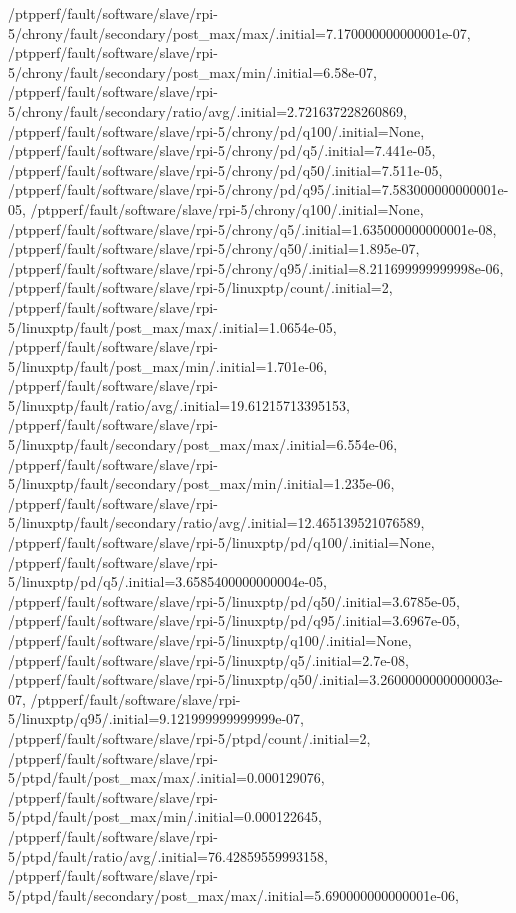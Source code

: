 {    /ptpperf/fault/software/slave/rpi-5/chrony/fault/secondary/post_max/max/.initial=7.170000000000001e-07,
    /ptpperf/fault/software/slave/rpi-5/chrony/fault/secondary/post_max/min/.initial=6.58e-07,
    /ptpperf/fault/software/slave/rpi-5/chrony/fault/secondary/ratio/avg/.initial=2.721637228260869,
    /ptpperf/fault/software/slave/rpi-5/chrony/pd/q100/.initial=None,
    /ptpperf/fault/software/slave/rpi-5/chrony/pd/q5/.initial=7.441e-05,
    /ptpperf/fault/software/slave/rpi-5/chrony/pd/q50/.initial=7.511e-05,
    /ptpperf/fault/software/slave/rpi-5/chrony/pd/q95/.initial=7.583000000000001e-05,
    /ptpperf/fault/software/slave/rpi-5/chrony/q100/.initial=None,
    /ptpperf/fault/software/slave/rpi-5/chrony/q5/.initial=1.635000000000001e-08,
    /ptpperf/fault/software/slave/rpi-5/chrony/q50/.initial=1.895e-07,
    /ptpperf/fault/software/slave/rpi-5/chrony/q95/.initial=8.211699999999998e-06,
    /ptpperf/fault/software/slave/rpi-5/linuxptp/count/.initial=2,
    /ptpperf/fault/software/slave/rpi-5/linuxptp/fault/post_max/max/.initial=1.0654e-05,
    /ptpperf/fault/software/slave/rpi-5/linuxptp/fault/post_max/min/.initial=1.701e-06,
    /ptpperf/fault/software/slave/rpi-5/linuxptp/fault/ratio/avg/.initial=19.61215713395153,
    /ptpperf/fault/software/slave/rpi-5/linuxptp/fault/secondary/post_max/max/.initial=6.554e-06,
    /ptpperf/fault/software/slave/rpi-5/linuxptp/fault/secondary/post_max/min/.initial=1.235e-06,
    /ptpperf/fault/software/slave/rpi-5/linuxptp/fault/secondary/ratio/avg/.initial=12.465139521076589,
    /ptpperf/fault/software/slave/rpi-5/linuxptp/pd/q100/.initial=None,
    /ptpperf/fault/software/slave/rpi-5/linuxptp/pd/q5/.initial=3.6585400000000004e-05,
    /ptpperf/fault/software/slave/rpi-5/linuxptp/pd/q50/.initial=3.6785e-05,
    /ptpperf/fault/software/slave/rpi-5/linuxptp/pd/q95/.initial=3.6967e-05,
    /ptpperf/fault/software/slave/rpi-5/linuxptp/q100/.initial=None,
    /ptpperf/fault/software/slave/rpi-5/linuxptp/q5/.initial=2.7e-08,
    /ptpperf/fault/software/slave/rpi-5/linuxptp/q50/.initial=3.2600000000000003e-07,
    /ptpperf/fault/software/slave/rpi-5/linuxptp/q95/.initial=9.121999999999999e-07,
    /ptpperf/fault/software/slave/rpi-5/ptpd/count/.initial=2,
    /ptpperf/fault/software/slave/rpi-5/ptpd/fault/post_max/max/.initial=0.000129076,
    /ptpperf/fault/software/slave/rpi-5/ptpd/fault/post_max/min/.initial=0.000122645,
    /ptpperf/fault/software/slave/rpi-5/ptpd/fault/ratio/avg/.initial=76.42859559993158,
    /ptpperf/fault/software/slave/rpi-5/ptpd/fault/secondary/post_max/max/.initial=5.690000000000001e-06,
}
